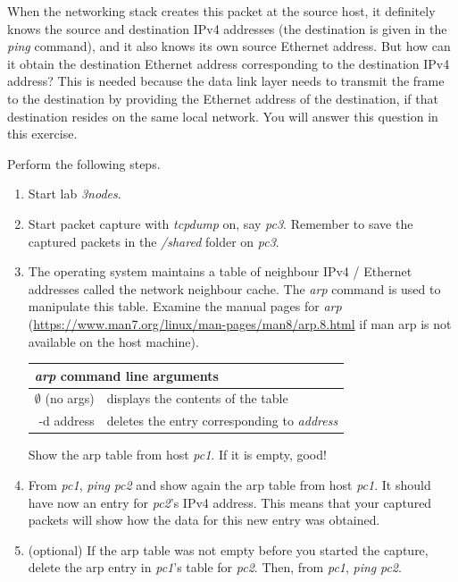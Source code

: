 \documentclass[12pt]{book}
\begin{document}
\begin{enumerate}[label=\arabic*.]
\begin{enumerate}[label=\arabic*.]
 When the networking stack creates this packet at the source host, it definitely knows the source and destination IPv4 addresses (the destination is given in the \emph{ping} command), and it also knows its own source Ethernet address. But how can it obtain the destination Ethernet address corresponding to the destination IPv4 address? This is needed because the data link layer needs to transmit the frame to the destination by providing the Ethernet address of the destination, if that destination resides on the same local network. You will answer this question in this exercise.

  Perform the following steps.
  \begin{enumerate}[label=(\roman*)]
  \item\label{first.1} Start lab \emph{3nodes}.
  \item Start packet capture with \emph{tcpdump} on, say \emph{pc3}. Remember to save the captured packets in the \emph{/shared} folder on \emph{pc3}.
  \item The operating system maintains a table of neighbour IPv4 / Ethernet addresses called the network neighbour cache. The \emph{arp} command is used to manipulate this table. Examine the manual pages for \emph{arp} (\url{https://www.man7.org/linux/man-pages/man8/arp.8.html} if man arp is not available on the host machine).

    \smallskip
    \begin{tabularx}{0.9\textwidth}{r l} \toprule
      \multicolumn{2}{l}{\emph{arp} command line arguments} \\ \midrule
      $\emptyset$ (no args) & displays the contents of the table \\
      -d address & deletes the  entry corresponding to \emph{address} \\ \bottomrule
    \end{tabularx}
    \smallskip

    Show the arp table from host \emph{pc1}. If it is empty, good!
    
  \item From \emph{pc1}, \emph{ping} \emph{pc2} and show again the arp table from host \emph{pc1}. It should have now an entry for \emph{pc2}'s IPv4 address. This means that your captured packets will show how the data for this new entry was obtained.
    
  \item (optional) If the arp table was not empty before you started the capture, delete the arp entry in \emph{pc1}'s table for \emph{pc2}. Then, from \emph{pc1}, \emph{ping} \emph{pc2}.


\end{enumerate}
\end{enumerate}
\end{enumerate}
\end{document}
